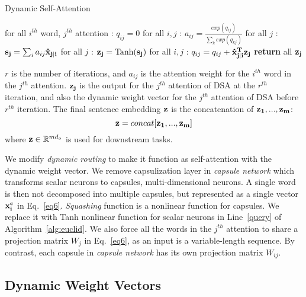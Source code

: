 \documentclass[11pt,a4paper]{article}
\begin{document}
\begin{algorithm}[H]
\centering
\caption{Dynamic Self-Attention}\label{alg:euclid}
\begin{algorithmic}[1]
\State for all $i^{th}$ word, $j^{th}$ attention : $q_{ij} = 0$
\State for all $i,j$ : ${a_{ij} = \frac{exp(q_{ij})}{{\sum_k}{exp(q_{kj})}}}$
\State for all $j$ : ${\bf s_{j}} = \sum_i a_{ij}{\bf {\hat x}_{j|i}}$
\State for all $j$ : ${\bf z_{j}} = \text{Tanh}({\bf s_{j}})$\label{query}
\State for all $i,j$ : $q_{ij} = q_{ij} + {\bf{\hat x}_{j|i}^T}{\bf z_{j}}$
\EndFor\label{euclidendwhile}
\State \textbf{return} all $\bf z_j$
\EndProcedure
\end{algorithmic}
\end{algorithm}

$r$ is the number of iterations, and $a_{ij}$ is the attention weight for the $i^{th}$ word in the $j^{th}$ attention. $\bf{z_j}$ is the output for the $j^{th}$ attention of DSA at the $r^{th}$ iteration, and also the dynamic weight vector for the $j^{th}$ attention of DSA before $r^{th}$ iteration. The final sentence embedding ${\bf z}$ is the concatenation of $\bf{z_1}, ..., \bf{z_m}$:
\begin{equation}
{\bf z} = concat[\bf{z_1}, ..., \bf{z_m}]\label{eq7}
\end{equation}
where ${\bf z}\in \mathbb{R}^{md_{o}}$ is used for downstream tasks.


We modify \textit{dynamic routing} \cite{capsule} to make it function as self-attention with the dynamic weight vector. We remove capsulization layer in \textit{capsule network} which transforms scalar neurons to capsules, multi-dimensional neurons. A single word is then not decomposed into multiple capsules, but represented as a single vector ${\bf x^{c}_i}$ in Eq.~\ref{eq6}. \textit{Squashing} function is a nonlinear function for capsules. We replace it with Tanh nonlinear function for scalar neurons in Line~\ref{query} of Algorithm~\ref{alg:euclid}. We also force all the words in the $j^{th}$ attention to share a projection matrix $W_{j}$ in Eq.~\ref{eq6}, as an input is a variable-length sequence. By contrast, each capsule in \textit{capsule network} has its own projection matrix $W_{ij}$.

\subsection{Dynamic Weight Vectors}\label{model3}
\end{document}
